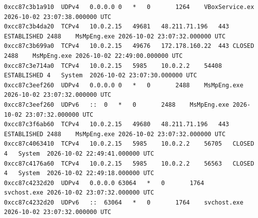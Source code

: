 \documentclass[11pt,letterpaper]{article}
\begin{document}
\begin{lstlisting}
0xcc87c3b1a910	UDPv4	0.0.0.0	0	*	0		1264	VBoxService.ex	2026-10-02 23:07:38.000000 UTC
0xcc87c3b4da20	TCPv4	10.0.2.15	49681	48.211.71.196	443	ESTABLISHED	2488	MsMpEng.exe	2026-10-02 23:07:32.000000 UTC
0xcc87c3b699a0	TCPv4	10.0.2.15	49676	172.178.160.22	443	CLOSED	2488	MsMpEng.exe	2026-10-02 22:49:00.000000 UTC
0xcc87c3e714a0	TCPv4	10.0.2.15	5985	10.0.2.2	54408	ESTABLISHED	4	System	2026-10-02 23:07:30.000000 UTC
0xcc87c3eef260	UDPv4	0.0.0.0	0	*	0		2488	MsMpEng.exe	2026-10-02 23:07:32.000000 UTC
0xcc87c3eef260	UDPv6	::	0	*	0		2488	MsMpEng.exe	2026-10-02 23:07:32.000000 UTC
0xcc87c3f6ab60	TCPv4	10.0.2.15	49680	48.211.71.196	443	ESTABLISHED	2488	MsMpEng.exe	2026-10-02 23:07:32.000000 UTC
0xcc87c4063410	TCPv4	10.0.2.15	5985	10.0.2.2	56705	CLOSED	4	System	2026-10-02 22:49:41.000000 UTC
0xcc87c4176a60	TCPv4	10.0.2.15	5985	10.0.2.2	56563	CLOSED	4	System	2026-10-02 22:49:18.000000 UTC
0xcc87c4232d20	UDPv4	0.0.0.0	63064	*	0		1764	svchost.exe	2026-10-02 23:07:32.000000 UTC
0xcc87c4232d20	UDPv6	::	63064	*	0		1764	svchost.exe	2026-10-02 23:07:32.000000 UTC


\end{lstlisting}
\end{document}

